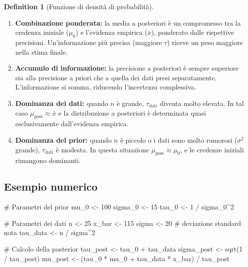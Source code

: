 \documentclass[
  letterpaper,
  DIV=11,
  numbers=noendperiod,
  oneside]{scrreprt}
\newenvironment{Shaded}{\begin{snugshade}}{\end{snugshade}}
\newcommand{\CommentTok}[1]{\textcolor[rgb]{0.37,0.37,0.37}{#1}}
\newcommand{\DecValTok}[1]{\textcolor[rgb]{0.68,0.00,0.00}{#1}}
\newcommand{\FunctionTok}[1]{\textcolor[rgb]{0.28,0.35,0.67}{#1}}
\newcommand{\NormalTok}[1]{\textcolor[rgb]{0.00,0.23,0.31}{#1}}
\newcommand{\OtherTok}[1]{\textcolor[rgb]{0.00,0.23,0.31}{#1}}
\newcommand{\SpecialCharTok}[1]{\textcolor[rgb]{0.37,0.37,0.37}{#1}}
\theoremstyle{definition}
\theoremstyle{plain}
\theoremstyle{definition}
\newtheorem{definition}{Definition}[chapter]
\theoremstyle{remark}
\begin{document}
\begin{definition}[Funzione di densità di
probabilità]
\begin{enumerate}
\def\labelenumi{\arabic{enumi}.}
\item
  \textbf{Combinazione ponderata:} la media a posteriori è un
  compromesso tra la credenza iniziale (\(\mu_0\)) e l'evidenza empirica
  (\(\bar{x}\)), ponderato dalle rispettive precisioni. Un'informazione
  più precisa (maggiore \(\tau\)) riceve un peso maggiore nella stima
  finale.
\item
  \textbf{Accumulo di informazione:} la precisione a posteriori è sempre
  superiore sia alla precisione a priori che a quella dei dati presi
  separatamente. L'informazione si somma, riducendo l'incertezza
  complessiva.
\item
  \textbf{Dominanza dei dati:} quando \(n\) è grande,
  \(\tau_{\text{dati}}\) diventa molto elevata. In tal caso
  \(\mu_{\text{post}} \approx \bar{x}\) e la distribuzione a posteriori
  è determinata quasi esclusivamente dall'evidenza empirica.
\item
  \textbf{Dominanza del prior:} quando \(n\) è piccolo o i dati sono
  molto rumorosi (\(\sigma^2\) grande), \(\tau_{\text{dati}}\) è
  modesta. In questa situazione \(\mu_{\text{post}} \approx \mu_0\), e
  le credenze iniziali rimangono dominanti.
\end{enumerate}

\subsection{Esempio numerico}\label{esempio-numerico}

\begin{Shaded}
\begin{Highlighting}[]
\CommentTok{\# Parametri del prior}
\NormalTok{mu\_0 }\OtherTok{\textless{}{-}} \DecValTok{100}
\NormalTok{sigma\_0 }\OtherTok{\textless{}{-}} \DecValTok{15}
\NormalTok{tau\_0 }\OtherTok{\textless{}{-}} \DecValTok{1} \SpecialCharTok{/}\NormalTok{ sigma\_0}\SpecialCharTok{\^{}}\DecValTok{2}

\CommentTok{\# Parametri dei dati}
\NormalTok{n }\OtherTok{\textless{}{-}} \DecValTok{25}
\NormalTok{x\_bar }\OtherTok{\textless{}{-}} \DecValTok{115}
\NormalTok{sigma }\OtherTok{\textless{}{-}} \DecValTok{20}  \CommentTok{\# deviazione standard nota}
\NormalTok{tau\_data }\OtherTok{\textless{}{-}}\NormalTok{ n }\SpecialCharTok{/}\NormalTok{ sigma}\SpecialCharTok{\^{}}\DecValTok{2}

\CommentTok{\# Calcolo della posterior}
\NormalTok{tau\_post }\OtherTok{\textless{}{-}}\NormalTok{ tau\_0 }\SpecialCharTok{+}\NormalTok{ tau\_data}
\NormalTok{sigma\_post }\OtherTok{\textless{}{-}} \FunctionTok{sqrt}\NormalTok{(}\DecValTok{1} \SpecialCharTok{/}\NormalTok{ tau\_post)}
\NormalTok{mu\_post }\OtherTok{\textless{}{-}}\NormalTok{ (tau\_0 }\SpecialCharTok{*}\NormalTok{ mu\_0 }\SpecialCharTok{+}\NormalTok{ tau\_data }\SpecialCharTok{*}\NormalTok{ x\_bar) }\SpecialCharTok{/}\NormalTok{ tau\_post}


\end{Highlighting}
\end{Shaded}
\end{definition}
\end{document}
